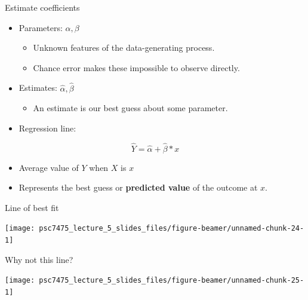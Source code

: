\documentclass[
  ignorenonframetext,
]{beamer}
\providecommand{\tightlist}{%
  \setlength{\itemsep}{0pt}\setlength{\parskip}{0pt}}
\begin{document}
\begin{frame}{Estimate coefficients}
\label{estimate-coefficients}
\pause

\begin{itemize}
\tightlist
\item
  Parameters: \(\alpha, \beta\)

  \begin{itemize}
  \tightlist
  \item
    Unknown features of the data-generating process.
  \item
    Chance error makes these impossible to observe directly. \pause
  \end{itemize}
\item
  Estimates: \(\hat{\alpha}, \hat{\beta}\)

  \begin{itemize}
  \tightlist
  \item
    An estimate is our best guess about some parameter. \pause
  \end{itemize}
\item
  Regression line:
\end{itemize}

\[
\hat{Y} = \hat{\alpha} + \hat{\beta} * x
\]

\begin{itemize}
\tightlist
\item
  Average value of \(Y\) when \(X\) is \(x\)
\item
  Represents the best guess or \textbf{predicted value} of the outcome
  at \(x\).
\end{itemize}
\end{frame}

\begin{frame}{Line of best fit}
\label{line-of-best-fit}
\begin{center}\texttt{[image: psc7475\_lecture\_5\_slides\_files/figure-beamer/unnamed-chunk-24-1]} \end{center}
\end{frame}

\begin{frame}{Why not this line?}
\label{why-not-this-line}
\begin{center}\texttt{[image: psc7475\_lecture\_5\_slides\_files/figure-beamer/unnamed-chunk-25-1]} \end{center}
\end{frame}
\end{document}
